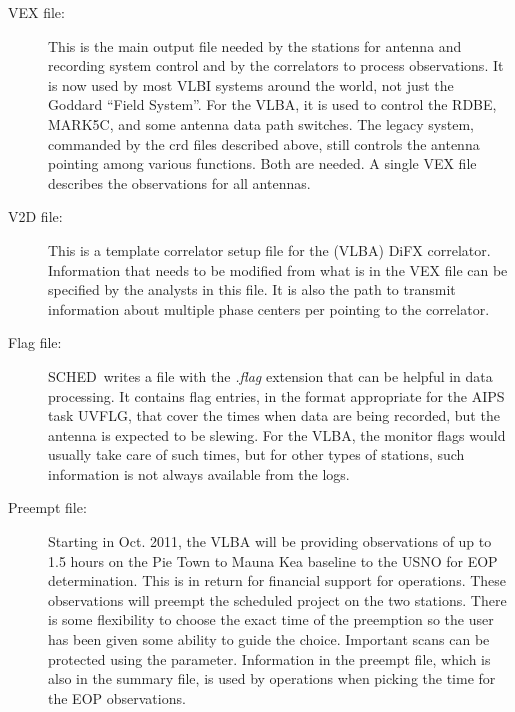 \documentclass{report}
\newcommand{\schedb}{{\sc SCHED~}}
\begin{document}
\begin{description}

\item[VEX file:] This is the main output file needed by the stations
for antenna and recording system control and by the correlators to
process observations.  It is now used by most VLBI systems around the
world, not just the Goddard ``Field System''.  For the VLBA, it is
used to control the RDBE, MARK5C, and some antenna data path switches.
The legacy system, commanded by the crd files described above, still
controls the antenna pointing among various functions.  Both are
needed.  A single VEX file describes the observations for all
antennas.

\item[V2D file:] This is a template correlator setup file for the
(VLBA) DiFX correlator.  Information that needs to be modified from what
is in the VEX file can be specified by the analysts in this file.
It is also the path to transmit information about multiple phase
centers per pointing to the correlator.

\item[Flag file:] \schedb writes a file with the {\sl .flag} extension
that can be helpful in data processing.  It contains flag entries, in
the format appropriate for the AIPS task UVFLG, that cover the times
when data are being recorded, but the antenna is expected to be
slewing.  For the VLBA, the monitor flags would usually take care of
such times, but for other types of stations, such information is not
always available from the logs.

\item[Preempt file:] Starting in Oct. 2011, the VLBA will be providing
observations of up to 1.5 hours on the Pie Town to Mauna Kea baseline
to the USNO for EOP determination.  This is in return for financial
support for operations.  These observations will preempt the scheduled
project on the two stations.  There is some flexibility to choose the
exact time of the preemption so the user has been given some ability
to guide the choice.  Important scans can be protected using the
 parameter.  Information in the
preempt file, which is also in the summary file, is used by operations
when picking the time for the EOP observations.


\end{description}
\end{document}
